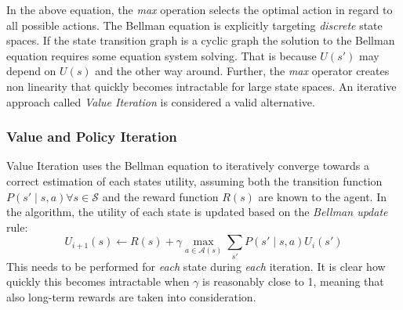 In the above equation, the \emph{max} operation selects the optimal action in regard to all possible actions. The
Bellman equation is explicitly targeting \emph{discrete} state spaces. If the state transition graph is a cyclic graph
the solution to the Bellman equation requires some equation system solving. That is because $U(s')$ may depend on $U(s)$
and the other way around. Further, the \emph{max} operator creates non linearity that quickly becomes intractable for
large state spaces. An iterative approach called \emph{Value Iteration} is considered a valid alternative.







\subsubsection{Value and Policy Iteration}%
\label{sub:policy_and_value_iteration}

Value Iteration uses the Bellman equation to iteratively converge towards a correct estimation of each states utility,
assuming both the transition function $P(s' \mid s,a) \forall s \in \mathcal{S}$ and the reward function $R(s)$ are
known to the agent.
In the algorithm, the utility of each state is updated based on the \emph{Bellman update} rule:
\begin{equation}
    U_{i+1}(s) \gets R(s) + \gamma \max_{a \in \mathcal{A}(s)} \sum_{s'}{P(s' \mid s,a) U_i(s')}
\end{equation}
This needs to be performed for \emph{each} state during \emph{each} iteration. It is clear how quickly this becomes
intractable when $\gamma$ is reasonably close to 1, meaning that also long-term rewards are taken into
consideration.

